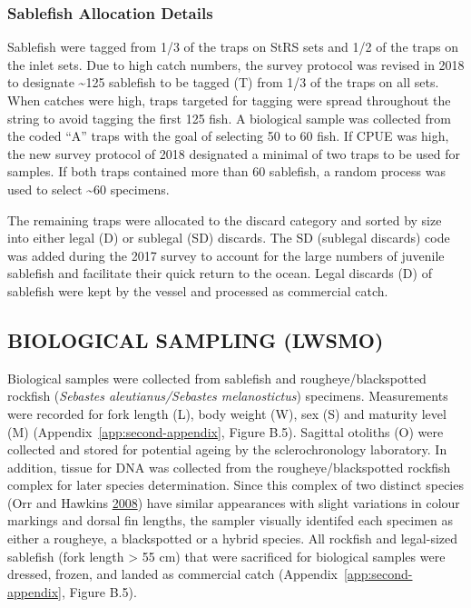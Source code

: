 \documentclass[12pt]{article}\usepackage[]{graphicx}\usepackage[]{color}
\begin{document}
\hypertarget{sablefish-allocation-details}{%
\subsubsection{Sablefish Allocation Details}\label{sablefish-allocation-details}}

Sablefish were tagged from 1/3 of the traps on StRS sets and 1/2 of the traps on the inlet sets. Due to high catch numbers, the survey protocol was revised in 2018 to designate \textasciitilde125 sablefish to be tagged (T) from 1/3 of the traps on all sets. When catches were high, traps targeted for tagging were spread throughout the string to avoid tagging the first 125 fish. A biological sample was collected from the coded ``A'' traps with the goal of selecting 50 to 60 fish. If CPUE was high, the new survey protocol of 2018 designated a minimal of two traps to be used for samples. If both traps contained more than 60 sablefish, a random process was used to select \textasciitilde60 specimens.

The remaining traps were allocated to the discard category and sorted by size into either legal (D) or sublegal (SD) discards. The SD (sublegal discards) code was added during the 2017 survey to account for the large numbers of juvenile sablefish and facilitate their quick return to the ocean. Legal discards (D) of sablefish were kept by the vessel and processed as commercial catch.

\hypertarget{biological-sampling-lwsmo}{%
\subsection{BIOLOGICAL SAMPLING (LWSMO)}\label{biological-sampling-lwsmo}}

Biological samples were collected from sablefish and rougheye/blackspotted rockfish (\emph{Sebastes aleutianus/Sebastes melanostictus}) specimens. Measurements were recorded for fork length (L), body weight (W), sex (S) and maturity level (M) (Appendix~\ref{app:second-appendix}, Figure B.5). Sagittal otoliths (O) were collected and stored for potential ageing by the sclerochronology laboratory. In addition, tissue for DNA was collected from the rougheye/blackspotted rockfish complex for later species determination. Since this complex of two distinct species (Orr and Hawkins \protect\hyperlink{ref-Orr2008}{2008}) have similar appearances with slight variations in colour markings and dorsal fin lengths, the sampler visually identifed each specimen as either a rougheye, a blackspotted or a hybrid species. All rockfish and legal-sized sablefish (fork length \textgreater{} 55 cm) that were sacrificed for biological samples were dressed, frozen, and landed as commercial catch (Appendix~\ref{app:second-appendix}, Figure B.5).
\end{document}
